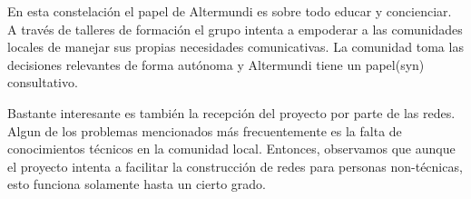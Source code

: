 En esta constelación el papel de Altermundi es sobre todo educar y concienciar.
A través de talleres de formación el grupo intenta a empoderar a las comunidades locales de manejar sus propias necesidades comunicativas.
La comunidad toma las decisiones relevantes de forma autónoma y Altermundi tiene un papel(syn) consultativo.


Bastante interesante es también la recepción del proyecto por parte de las redes.
Algun de los problemas mencionados más frecuentemente es la falta de conocimientos técnicos en la comunidad local.
Entonces, observamos que aunque el proyecto intenta a facilitar la construcción de redes para personas non-técnicas, esto funciona solamente hasta un cierto grado.

\begin{comment}

[nico-iv-pillku]
"Más allá de los desafíos típicos relacionados a la dinámica social, las estrategias de transferencia de conocimiento y las problemáticas económicas típicas de las poblaciones pequeñas donde se despliegan estas redes comunitarias, la región sufre otros problemas estructurales en cuanto al acceso a la red global."
"En nuestro país, como en el resto de Latinoamérica y en general en los países que no son históricamente centrales en el desarrollo de Internet, la principal dificultad para cualquier intento de democratización del acceso a la vida digital es el “impuesto al más débil” que pagamos cuando queremos comprar ancho de banda dedicado, para conectar estas redes al resto de Internet. Para dar una idea de la dimensión de este problema basta un ejemplo: en el Punto Neutro (Internet Exchange) de Cataluña, se puede comprar 1Gbps, es decir “mil megas por segundo” en vocabulario coloquial, por un valor mensual de 780 us dolares. En la Argentina, aún con los esfuerzos colectivos realizados por los pequeños y medianos operadores nucleados en la Cámara Argentina de Internet, el costo por 1Mbps en un Punto Neutro local ronda los u$s 40. Es decir que 1Gbps costaría unos u$s 40.000 por mes: un 5.100 por ciento (51 veces) más caro que en Europa.
Para entender cómo impacta esto en la democratización del acceso a la red de redes, pensemos que con lo que cuesta comprar 1Gbps durante un mes en Argentina, se podría contratar durante más de 4 años el mismo servicio en Cataluña, que tampoco es la plaza más económica del mundo.
Hoy en día, que en la Argentina los abusos en las diferentes cadenas de valor se han puesto en la mira con una política activa, sería muy positivo que hubiera una evaluación seria sobre los costos reales que afrontan los proveedores mayoristas en esta actividad y sobre todo tomar dimensión de los valores que se manejan en el mundo para desentramar este abuso que sufrimos a manos de un núcleo muy concentrado de empresas multinacionales.
"


\end{comment}
